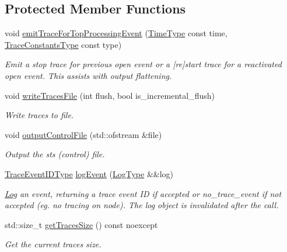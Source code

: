 \subsection*{Protected Member Functions}
\begin{DoxyCompactItemize}
\item 
void \hyperlink{structvt_1_1trace_1_1_trace_lite_a0fe1ea3e54a0428639c5fe338ce9a04f}{emit\+Trace\+For\+Top\+Processing\+Event} (\hyperlink{namespacevt_a2b9f28078dc309ad0706b69ded743e69}{Time\+Type} const time, \hyperlink{namespacevt_1_1trace_acf454dfbd581b0ebae895f90b5927a1d}{Trace\+Constants\+Type} const type)
\begin{DoxyCompactList}\small\item\em Emit a \textquotesingle{}stop\textquotesingle{} trace for previous open event or a \textquotesingle{}\mbox{[}re\mbox{]}start\textquotesingle{} trace for a reactivated open event. This assists with output flattening. \end{DoxyCompactList}\item 
void \hyperlink{structvt_1_1trace_1_1_trace_lite_aa385172051bc8f3fc58a345fec10eae2}{write\+Traces\+File} (int flush, bool is\+\_\+incremental\+\_\+flush)
\begin{DoxyCompactList}\small\item\em Write traces to file. \end{DoxyCompactList}\item 
void \hyperlink{structvt_1_1trace_1_1_trace_lite_a7b60eedbf68a4989a1566f2cf85d94dd}{output\+Control\+File} (std\+::ofstream \&file)
\begin{DoxyCompactList}\small\item\em Output the sts (control) file. \end{DoxyCompactList}\item 
\hyperlink{namespacevt_1_1trace_a64a7185f3e102df8d8258f263ccd1582}{Trace\+Event\+I\+D\+Type} \hyperlink{structvt_1_1trace_1_1_trace_lite_aeb468f1222761674e4ffb0cfa27f0641}{log\+Event} (\hyperlink{structvt_1_1trace_1_1_trace_lite_aeb73e523d31829d3163c877b145afa2a}{Log\+Type} \&\&log)
\begin{DoxyCompactList}\small\item\em \hyperlink{structvt_1_1trace_1_1_log}{Log} an event, returning a trace event ID if accepted or {\ttfamily no\+\_\+trace\+\_\+event} if not accepted (eg. no tracing on node). The log object is invalidated after the call. \end{DoxyCompactList}\item 
std\+::size\+\_\+t \hyperlink{structvt_1_1trace_1_1_trace_lite_a41527439099e35c51d539201238dbe96}{get\+Traces\+Size} () const noexcept
\begin{DoxyCompactList}\small\item\em Get the current traces size. \end{DoxyCompactList}\end{DoxyCompactItemize}
